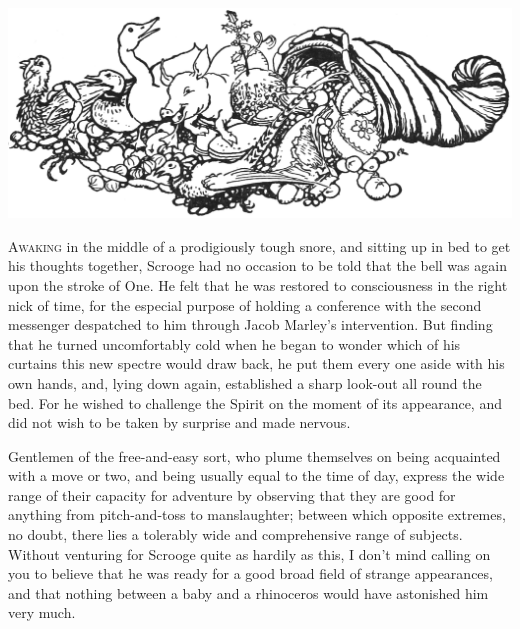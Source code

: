 \documentclass[paper=5.5in:8.5in,BCOR=5mm,twoside,DIV=calc,12pt,usegeometry]{scrbook} %
\begin{document}
\begin{minipage}[c]{\linewidth}
\includegraphics[width=\linewidth]{cornucopia}
\end{minipage}

\lettrine[loversize=.85]{A}{waking} in the middle of a prodigiously tough snore, and sitting up in bed to get his thoughts together, Scrooge had no occasion to be told that the bell was again upon the stroke of One. He felt that he was restored to consciousness in the right nick of time, for the especial purpose of holding a conference with the second messenger despatched to him through Jacob Marley's intervention. But finding that he turned uncomfortably cold when he began to wonder which of his curtains this new spectre would draw back, he put them every one aside with his own hands, and, lying down again, established a sharp look-out all round the bed. For he wished to challenge the Spirit on the moment of its appearance, and did not wish to be taken by surprise and made nervous.

Gentlemen of the free-and-easy sort, who plume themselves on being acquainted with a move or two, and being usually equal to the time of day, express the wide range of their capacity for adventure by observing that they are good for anything from pitch-and-toss to manslaughter; between which opposite extremes, no doubt, there lies a tolerably wide and comprehensive range of subjects. Without venturing for Scrooge quite as hardily as this, I don't mind calling on you to believe that he was ready for a good broad field of strange appearances, and that nothing between a baby and a rhinoceros would have astonished him very much.
\end{document}
